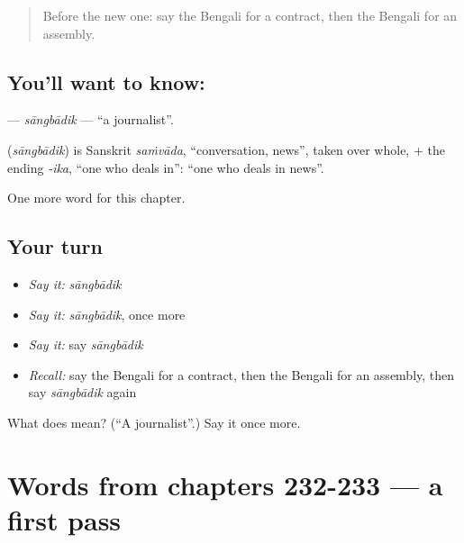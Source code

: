 \label{lesson:BN-C236-sangbadik}



\begin{quote}
Before the new one: say the Bengali for a contract, then the Bengali for an assembly.
\end{quote}

\subsection*{You'll want to know: }
\textbf{} — \emph{sāngbādik} — \textquotedblleft{}a journalist\textquotedblright{}.

\begin{cousinweb}
\textbf{} (\emph{sāngbādik}) is Sanskrit \emph{saṁvāda}, \textquotedblleft{}conversation, news\textquotedblright{}, taken over whole, + the ending \emph{-ika}, \textquotedblleft{}one who deals in\textquotedblright{}: \textquotedblleft{}one who deals in news\textquotedblright{}.
\end{cousinweb}

\begin{grammarlens}[title={What you've built}]
One more word for this chapter.
\end{grammarlens}

\subsection*{Your turn}
\begin{itemize}
\raggedright
  \item \emph{Say it:} \emph{sāngbādik}
  \item \emph{Say it:} \emph{sāngbādik}, once more
  \item \emph{Say it:} say \emph{sāngbādik}
  \item \emph{Recall:} say the Bengali for a contract, then the Bengali for an assembly, then say \emph{sāngbādik} again
\end{itemize}

\begin{tcolorbox}[breakable,colback=teal!4,colframe=teal!35!black,title={Before you move on}]
What does  mean? (\textquotedblleft{}A journalist\textquotedblright{}.) Say it once more.
\end{tcolorbox}
\section[(dialogue)]{Words from chapters 232-233 — a first pass}

